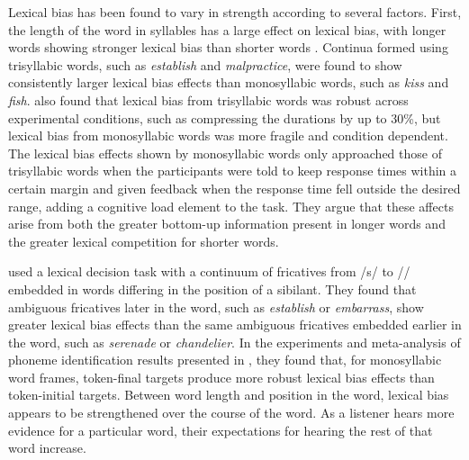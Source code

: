 Lexical bias has been found to vary in strength according to several factors.  
First, the length of the word in syllables has a large effect on lexical bias, with longer words showing stronger lexical bias than shorter words \citep{Pitt2006}.  
Continua formed using trisyllabic words, such as \emph{establish} and \emph{malpractice}, were found to show consistently larger lexical bias effects than monosyllabic words, such as \emph{kiss} and \emph{fish}.  
\citet{Pitt2006} also found that lexical bias from trisyllabic words was robust across experimental conditions, such as compressing the durations by up to 30\%, but lexical bias from monosyllabic words was more fragile and condition dependent.
The lexical bias effects shown by monosyllabic words only approached those of trisyllabic words when the participants were told to keep response times within a certain margin and given feedback when the response time fell outside the desired range, adding a cognitive load element to the task.
They argue that these affects arise from both the greater bottom-up information present in longer words and the greater lexical competition for shorter words.

\citet{Pitt2012} used a lexical decision task with a continuum of fricatives from /s/ to /\textesh/ embedded in words differing in the position of a sibilant.  
They found that ambiguous fricatives later in the word, such as \emph{establish} or \emph{embarrass}, show greater lexical bias effects than the same ambiguous fricatives embedded earlier in the word, such as \emph{serenade} or \emph{chandelier}.
In the experiments and meta-analysis of phoneme identification results presented in \citet{Pitt1993}, they found that, for monosyllabic word frames, token-final targets produce more robust lexical bias effects than token-initial targets.
Between word length and position in the word, lexical bias appears to be strengthened over the course of the word.
As a listener hears more evidence for a particular word, their expectations for hearing the rest of that word increase.

